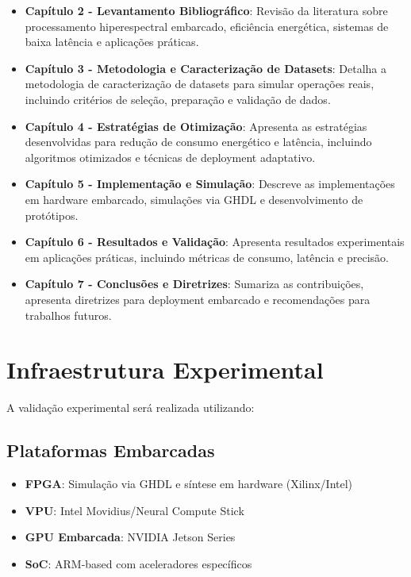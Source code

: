 \begin{itemize}
    \item \textbf{Capítulo 2 - Levantamento Bibliográfico}: Revisão da literatura sobre processamento hiperespectral embarcado, eficiência energética, sistemas de baixa latência e aplicações práticas.
    
    \item \textbf{Capítulo 3 - Metodologia e Caracterização de Datasets}: Detalha a metodologia de caracterização de datasets para simular operações reais, incluindo critérios de seleção, preparação e validação de dados.
    
    \item \textbf{Capítulo 4 - Estratégias de Otimização}: Apresenta as estratégias desenvolvidas para redução de consumo energético e latência, incluindo algoritmos otimizados e técnicas de deployment adaptativo.
    
    \item \textbf{Capítulo 5 - Implementação e Simulação}: Descreve as implementações em hardware embarcado, simulações via GHDL e desenvolvimento de protótipos.
    
    \item \textbf{Capítulo 6 - Resultados e Validação}: Apresenta resultados experimentais em aplicações práticas, incluindo métricas de consumo, latência e precisão.
    
    \item \textbf{Capítulo 7 - Conclusões e Diretrizes}: Sumariza as contribuições, apresenta diretrizes para deployment embarcado e recomendações para trabalhos futuros.
\end{itemize}

\section{Infraestrutura Experimental}\label{sec:infraestrutura}

A validação experimental será realizada utilizando:

\subsection{Plataformas Embarcadas}
\begin{itemize}
    \item \textbf{FPGA}: Simulação via GHDL e síntese em hardware (Xilinx/Intel)
    \item \textbf{VPU}: Intel Movidius/Neural Compute Stick
    \item \textbf{GPU Embarcada}: NVIDIA Jetson Series
    \item \textbf{SoC}: ARM-based com aceleradores específicos
\end{itemize}

